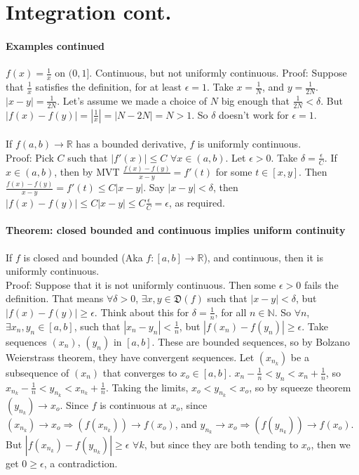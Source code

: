 \documentclass[10pt,letter]{article}
\begin{document}
\section*{Integration cont.}

\paragraph*{Examples continued}
$f(x)=\frac{1}{x}$ on $(0,1]$. Continuous, but not uniformly continuous. Proof: Suppose that $\frac{1}{x}$ satisfies the definition, for at least $\epsilon=1$. Take $x=\frac{1}{N}$, and $y=\frac{1}{2N}$. $|x-y|=\frac{1}{2N}$. Let's assume we made a choice of $N$ big enough that $\frac{1}{2N}<\delta$. But $|f(x)-f(y)|=|\frac{1}{x}|=|N-2N|=N>1$. So $\delta$ doesn't work for $\epsilon=1$. \\ \\ 

If $f(a,b)\rightarrow\mathbb{R}$ has a bounded derivative, $f$ is uniformly continuous. \\ 
Proof: Pick $C$ such that $|f'(x)|\leq C$ $\forall x\in(a,b)$. Let $\epsilon>0$. Take $\delta=\frac{\epsilon}{C}$. If $x\in(a,b)$, then by MVT $\frac{f(x)-f(y)}{x-y}=f'(t)$ for some $t\in[x,y]$. Then $\frac{f(x)-f(y)}{x-y}=f'(t)\leq C|x-y|$. Say $|x-y|<\delta$, then $|f(x)-f(y)|\leq C|x-y|\leq C\frac{\epsilon}{C}=\epsilon$, as required. 

\paragraph{Theorem: closed bounded and continuous implies uniform continuity}
If $f$ is closed and bounded (Aka $f:[a,b]\rightarrow\mathbb{R}$), and continuous, then it is uniformly continuous. \\ 
Proof: Suppose that it is not uniformly continuous. Then some $\epsilon>0$ fails the definition. That means $\forall\delta>0$, $\exists x,y\in\mathfrak{D}(f)$ such that $|x-y|<\delta$, but $|f(x)-f(y)|\geq\epsilon$. Think about this for $\delta=\frac{1}{n}$, for all $n\in\mathbb{N}$. So $\forall n$, $\exists x_n, y_n\in[a,b]$, such that $|x_n-y_n|<\frac{1}{n}$, but $|f(x_n)-f(y_n)|\geq\epsilon$. Take sequences $(x_n)$, $(y_n)$ in $[a,b]$. These are bounded sequences, so by Bolzano Weierstrass theorem, they have convergent sequences. Let $(x_{n_k})$ be a subsequence of $(x_n)$ that converges to $x_o\in[a,b]$. $x_n-\frac{1}{n}<y_n<x_n+\frac{1}{n}$, so $x_{n_k}-\frac{1}{n}<y_{n_k}<x_{n_k}+\frac{1}{n}$. Taking the limits, $x_o<y_{n_k}<x_o$, so by squeeze theorem $(y_{n_k})\rightarrow x_o$. Since $f$ is continuous at $x_o$, since $(x_{n_k})\rightarrow x_o\Rightarrow(f(x_{n_k}))\rightarrow f(x_o)$, and $y_{n_k}\rightarrow x_o\Rightarrow(f(y_{n_k}))\rightarrow f(x_o)$. But $|f(x_{n_k})-f(y_{n_k})|\geq \epsilon$ $\forall k$, but since they are both tending to $x_o$, then we get $0\geq\epsilon$, a contradiction. 
\end{document}
